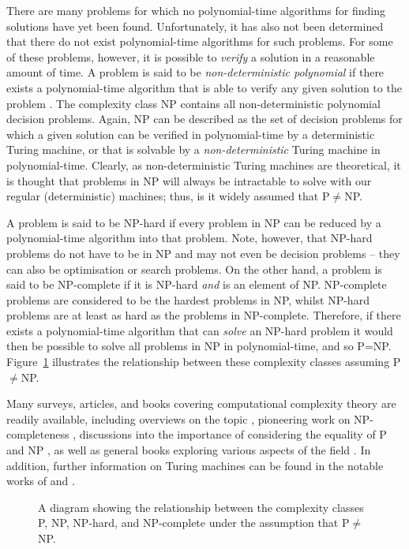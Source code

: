 \documentclass[a4paper,11pt]{article}
\begin{document}
There are many problems for which no polynomial-time algorithms for finding solutions have yet been found. Unfortunately, it has also not been determined that there do not exist polynomial-time algorithms for such problems. For some of these problems, however, it is possible to \emph{verify} a solution in a reasonable amount of time. A problem is said to be \emph{non-deterministic polynomial} if there exists a polynomial-time algorithm that is able to verify any given solution to the problem \citep{cook1971}. The complexity class NP contains all non-deterministic polynomial decision problems. Again, NP can be described as the set of decision problems for which a given solution can be verified in polynomial-time by a deterministic Turing machine, or that is solvable by a \emph{non-deterministic} Turing machine in polynomial-time. Clearly, as non-deterministic Turing machines are theoretical, it is thought that problems in NP will always be intractable to solve with our regular (deterministic) machines; thus, is it widely assumed that P$\neq$NP.

A problem is said to be NP-hard if every problem in NP can be reduced by a polynomial-time algorithm into that problem. Note, however, that NP-hard problems do not have to be in NP and may not even be decision problems -- they can also be optimisation or search problems. On the other hand, a problem is said to be NP-complete if it is NP-hard \emph{and} is an element of NP. NP-complete problems are considered to be the hardest problems in NP, whilst NP-hard problems are at least as hard as the problems in NP-complete. Therefore, if there exists a polynomial-time algorithm that can \emph{solve} an NP-hard problem it would then be possible to solve all problems in NP in polynomial-time, and so P=NP.  Figure~\ref{fig:complexity} illustrates the relationship between these complexity classes assuming P$\neq$NP. 

Many surveys, articles, and books covering computational complexity theory are readily available, including overviews on the topic \citep{cook1983}, pioneering work on NP-completeness \citep{karp1972}, discussions into the importance of considering the equality of P and NP \citep{cook2006}, as well as general books exploring various aspects of the field \citep{garey1979, papadimitriou2003}. In addition, further information on Turing machines can be found in the notable works of \citet{petzold2008} and \citet{jongen2007}.

\begin{figure}[h!]	
	\centering
	
	\caption{A diagram showing the relationship between the complexity classes P, NP, NP-hard, and NP-complete under the assumption that P$\neq$NP.}	
	\label{fig:complexity}
\end{figure}
\end{document}
